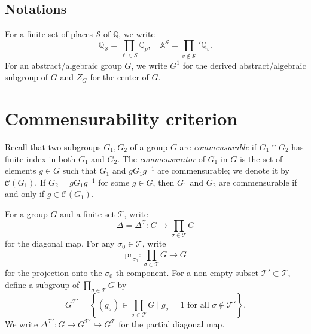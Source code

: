 \documentclass[11pt,oneside,reqno]{amsart}
\newcommand{\Q}{\mathbb{Q}}
\newcommand{\Ccal}{\mathcal{C}}
\newcommand{\Tcal}{\mathcal{T}}
\newcommand{\bcS}{\mathcal{S}}
\theoremstyle{plain}
\begin{document}
	
	
	
	
	
	
	
	
	

	
	
	
	
	
	
	
	
	
	
	
	
	
	
	
	\subsection*{Notations}
	For a finite set of places $\bcS$ of $\Q$, we write
	\[
	\Q_\bcS
	=
	\prod_{\ell\in\bcS}
	\Q_p,
	\quad
	\mathbb{A}^\bcS
	=
	\prod_{v\notin\bcS}\,'\Q_v.
	\]
	For an abstract/algebraic group $G$, we write $G^1$ for the derived abstract/algebraic subgroup of $G$ and $Z_G$ for the center of $G$.
	
	
	
	\section{Commensurability criterion}\label{Commensurability criterion}
	Recall that two subgroups $G_1,G_2$ of a group $G$ are \textit{commensurable} if $G_1\cap G_2$ has finite index in both $G_1$ and $G_2$. The \emph{commensurator} of $G_1$ in $G$ is the set of elements $g\in G$ such that $G_1$ and $gG_1g^{-1}$ are commensurable; we denote it by $\Ccal(G_1)$. If $G_2=gG_1g^{-1}$ for some $g\in G$, then $G_1$ and $G_2$ are commensurable if and only if $g\in\Ccal(G_1)$.
	
	
	
	
	For a group $G$ and a finite set $\mathcal{T}$, write
	\[
	\Delta=\Delta^\Tcal
	\colon G\rightarrow\prod_{\sigma\in\mathcal{T}} G
	\]
	for the diagonal map. For any $\sigma_0\in\mathcal{T}$, write
	\[
	\mathrm{pr}_{\sigma_0}\colon\prod_{\sigma\in\mathcal{T}} G\rightarrow G
	\]
	for the projection onto the $\sigma_0$-th component.
	For a non-empty subset $\mathcal{T}'\subset\mathcal{T}$, define a subgroup of $\prod_{\sigma\in\mathcal{T}} G$ by
	\[
	G^{\mathcal{T}'}
	=
	\left\{
	(g_{\sigma})
	\in
	\prod_{\sigma\in\mathcal{T}} G
	\mid
	g_{\sigma}=1\text{ for all }\sigma\notin\mathcal{T}'
	\right\}.
	\]
	We write $\Delta^{\mathcal{T}'}\colon G\to G^{\mathcal{T}'}\hookrightarrow G^{\mathcal{T}}$ for the partial diagonal map.
	
	
	
\end{document}
